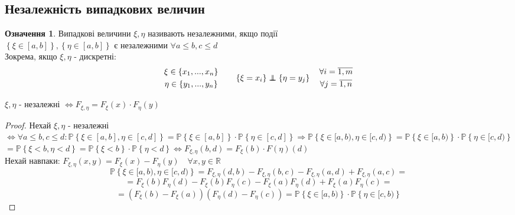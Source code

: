 \documentclass[fontsize=14pt,a4paper]{scrartcl}
\theoremstyle{definition}
\newtheorem*{defo}{Означення}
\theoremstyle{remark}
\theoremstyle{definition}
\theoremstyle{definition}
\newcommand\independent{\protect\mathpalette{\protect\independenT}{\perp}}
\def\independenT#1#2{\mathrel{\rlap{$#1#2$}\mkern2mu{#1#2}}}
\begin{document}
\subsection{Незалежність випадкових величин}
\begin{defo}
	Випадкові величини $\xi, \eta$ називають незалежними, якщо події \\$ \left\lbrace \xi\in [a,b] \right\rbrace, \left\lbrace \eta\in [a,b] \right\rbrace $ є незалежними $ \forall a \leq  b , c\leq d$\\
	Зокрема, якщо $\xi, \eta$ - дискретні:
	$$
	\begin{gathered}
	 \xi \in \left\lbrace x_1, ..., x_n \right\rbrace\\
	 \eta \in \left\lbrace y_1, ..., y_n  \right\rbrace
	\end{gathered} \qquad \left\lbrace \xi = x_i \right\rbrace \independent \left\lbrace \eta = y_j \right\rbrace \quad \begin{gathered}
	 \forall i = \overline{1, m}\\
	 \forall j = \overline{1, n}
	\end{gathered}
	$$

\end{defo}
\begin{boxteo}
	$\xi, \eta$ - незалежні $\Leftrightarrow F_{\xi, \eta} = F_{\xi}(x) \cdot F_{\eta}(y)$
\end{boxteo}
\begin{proof}
Нехай $\xi, \eta$ - незалежні $\Leftrightarrow \forall a\leq b, c\leq d: \mathbb{P} \left\lbrace  \xi \in [a,b], \eta \in [c,d] \right\rbrace \!=\! \mathbb{P} \left\lbrace \xi\in[a,b] \right\rbrace \cdot \mathbb{P} \left\lbrace \eta\in[c,d] \right\rbrace \Rightarrow \mathbb{P} \left\lbrace  \xi\in [a,b), \eta \in [c,d) \right\rbrace \!=\! \mathbb{P} \left\lbrace \xi \in [a,b) \right\rbrace \cdot \mathbb{P} \left\lbrace \eta \in [c,d) \right\rbrace  $\\
$
=\!\mathbb{P} \left\lbrace \xi\!<\!b, \eta \!<\!d  \right\rbrace \!=\! \mathbb{P} \left\lbrace \xi \!<\! b \right\rbrace \cdot \mathbb{P} \left\lbrace \eta \!<\!d \right\rbrace \!\Leftrightarrow\! F_{\xi, \eta} (b,d) \!=\! F_{\xi}(b) \cdot F(\eta)(d)
$\\
Нехай навпаки: $ F_{\xi, \eta } (x,y)  = F_{\xi}(x) - F_{\eta}(y)\quad \forall x,y \in \mathbb{R}$
$$
\mathbb{P} \left\lbrace  \xi\in [a,b), \eta \in [c,d)\right\rbrace = F_{\xi, \eta} (d,b) - F_{\xi,\eta}(b,c) - F_{\xi, \eta }(a,d) + F_{\xi, \eta}(a,c) =
$$
$$
= F_{\xi}(b) F_{\eta} (d) - F_{\xi}(b) F_{\eta}(c) - F_{\xi}(a) F_{\eta}(d) + F_{\xi}(a) F_{\eta}(c)  =$$
$$= \left( F_{\xi}(b) - F_{\xi}(a) \right) \left( F_{\eta}(d) - F_\eta (c) \right) = \mathbb{P} \left\lbrace \xi\in [a,b) \right\rbrace \cdot \mathbb{P} \left\lbrace \eta \in [c,b) \right\rbrace
$$

\end{proof}


\newpage

\vfill

\end{document}
